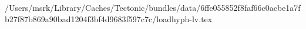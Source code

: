 /Users/msrk/Library/Caches/Tectonic/bundles/data/6ffe055852f8faf66c0acbe1a7fb27f87b869a90bad1204f3bf4d9683f597c7c/loadhyph-lv.tex